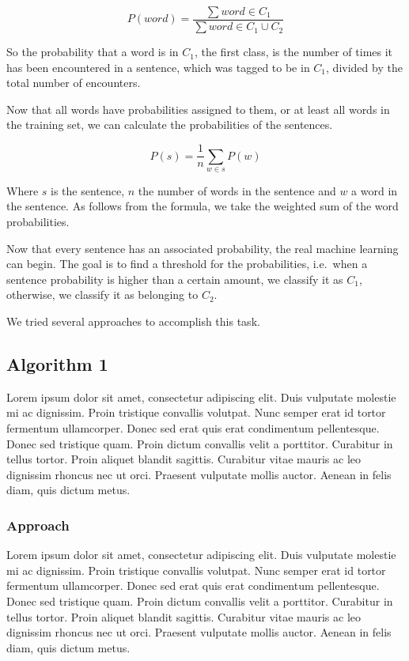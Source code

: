 \documentclass[11pt]{article}
\begin{document}
\begin{equation}
P(word) = \frac{ \sum word \in C_1}{\sum word \in C_1\cup C_2}
\end{equation}

So the probability that a word is in $C_1$, the first class, is the number of times it has been encountered in a sentence, which was tagged to be in $C_1$, divided by the total number of encounters.

Now that all words have probabilities assigned to them, or at least all words in the training set, we can calculate the probabilities of the sentences.

\begin{equation}
P(s) = \frac{1}{n} \sum_{w \in s} P(w)
\end{equation}

Where $s$ is the sentence, $n$ the number of words in the sentence and $w$ a word in the sentence. As follows from the formula, we take the weighted sum of the word probabilities.

Now that every sentence has an associated probability, the real machine learning can begin. The goal is to find a threshold for the probabilities, i.e.\ when a sentence probability is higher than a certain amount, we classify it as $C_1$,  otherwise, we classify it as belonging to $C_2$.

We tried several approaches to accomplish this task.


\subsection{Algorithm 1}
Lorem ipsum dolor sit amet, consectetur adipiscing elit. Duis vulputate molestie mi ac dignissim. Proin tristique convallis volutpat. Nunc semper erat id tortor fermentum ullamcorper. Donec sed erat quis erat condimentum pellentesque. Donec sed tristique quam. Proin dictum convallis velit a porttitor. Curabitur in tellus tortor. Proin aliquet blandit sagittis. Curabitur vitae mauris ac leo dignissim rhoncus nec ut orci. Praesent vulputate mollis auctor. Aenean in felis diam, quis dictum metus.

\subsubsection{Approach}
Lorem ipsum dolor sit amet, consectetur adipiscing elit. Duis vulputate molestie mi ac dignissim. Proin tristique convallis volutpat. Nunc semper erat id tortor fermentum ullamcorper. Donec sed erat quis erat condimentum pellentesque. Donec sed tristique quam. Proin dictum convallis velit a porttitor. Curabitur in tellus tortor. Proin aliquet blandit sagittis. Curabitur vitae mauris ac leo dignissim rhoncus nec ut orci. Praesent vulputate mollis auctor. Aenean in felis diam, quis dictum metus.
\end{document}

